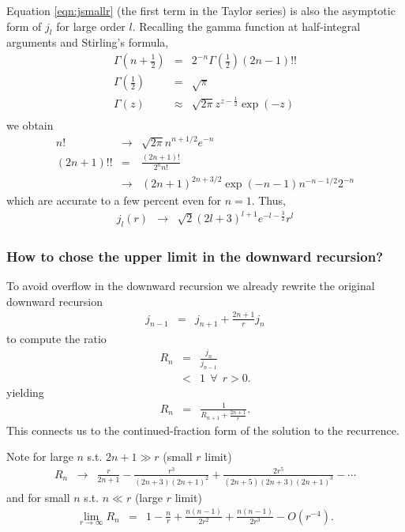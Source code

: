 \documentclass[12pt]{article}
\begin{document}
Equation \ref{eqn:jsmallr} (the first term in the Taylor series) is also the asymptotic form of $j_l$ for large order $l$.  Recalling the gamma function at half-integral arguments and Stirling's formula,
\begin{eqnarray}
  \Gamma(n+\frac{1}{2}) & = & 2^{-n} \Gamma(\frac{1}{2}) (2n-1)!! \\
  \Gamma(\frac{1}{2}) & = & \sqrt{\pi} \\
  \Gamma(z) & \approx & \sqrt{2 \pi} z^{z - \frac{1}{2}} \exp(-z) \\
\end{eqnarray}
we obtain
\begin{eqnarray}
  n! & \rightarrow & \sqrt{2 \pi} n^{n+1/2} e^{-n} \\
  (2n+1)!! & = & \frac{(2n+1)!}{2^n n!} \\
  & \rightarrow & (2n + 1)^{2n+3/2} \exp(-n - 1) n^{-n - 1/2} 2^{-n}
\end{eqnarray}
which are accurate to a few percent even for $n=1$.  Thus, 
\begin{eqnarray}
  j_l(r) & \rightarrow & \sqrt{2} (2 l+3)^{l+1} e^{-l-\frac{3}{2}} r^l 
\end{eqnarray}

\subsubsection{How to chose the upper limit in the downward recursion?}

To avoid overflow in the downward recursion we already rewrite the original downward recursion
\begin{eqnarray}
  j_{n-1} & = & j_{n+1} + \frac{2n+1}{r} j_{n} 
\end{eqnarray}
to compute the ratio
\begin{eqnarray}
  R_n & = & \frac{j_n}{j_{n-1}} \\
      & < & 1 ~ ~ \forall ~ ~ r>0.
\end{eqnarray}
yielding
\begin{eqnarray}
  R_{n} & = & \frac{1}{R_{n+1} + \frac{2n+1}{r}}.
\end{eqnarray}
This connects us to the continued-fraction form of the solution to the recurrence.

Note for large $n$ s.t. $2n+1 \gg r$ (small $r$ limit)
\begin{eqnarray}
  R_n & \rightarrow & \frac{r}{2n+1} - \frac{r^3}{(2n + 3)(2 n + 1)^2} + \frac{2r^5}{(2 n + 5) (2 n + 3) (2 n + 1)^3} - \cdots
\end{eqnarray}
and for small $n$ s.t. $n \ll r$ (large $r$ limit)
\begin{eqnarray}
  \lim_{r \rightarrow \infty} R_n & = & 1 - \frac{n}{r} + \frac{n(n-1)}{2 r^2} + \frac{n(n-1)}{2 r^3} - O(r^{-4}).
\end{eqnarray}
\end{document}
